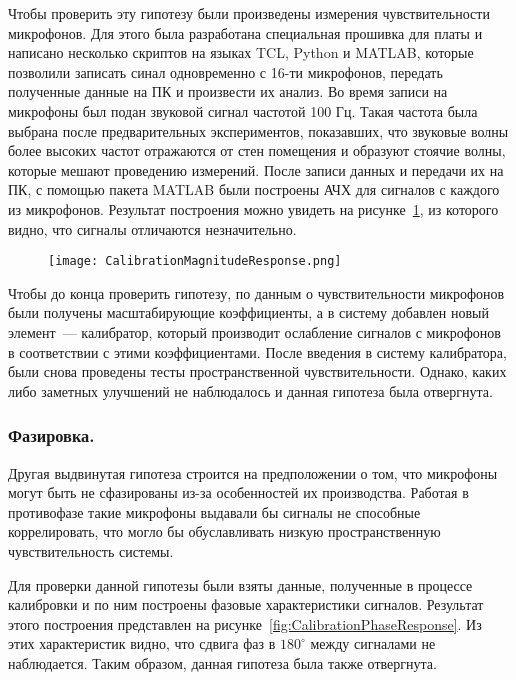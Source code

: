 Чтобы проверить эту гипотезу были произведены измерения чувствительности микрофонов. Для этого была разработана специальная прошивка для платы \boardname{} и написано несколько скриптов на языках TCL, Python и MATLAB, которые позволили записать синал одновременно с 16-ти микрофонов, передать полученные данные на ПК и произвести их анализ. Во время записи на микрофоны был подан звуковой сигнал частотой 100 Гц. Такая частота была выбрана после предварительных экспериментов, показавших, что звуковые волны более высоких частот отражаются от стен помещения и образуют стоячие волны, которые мешают проведению измерений. После записи данных и передачи их на ПК, с помощью пакета MATLAB были построены АЧХ для сигналов с каждого из микрофонов. Результат построения можно увидеть на рисунке~\ref{fig:CalibrationMagnitudeResponse}, из которого видно, что сигналы отличаются незначительно.

\begin{figure}[ht]
	\centering
	\texttt{[image: CalibrationMagnitudeResponse.png]}  
	\caption{}
	\label{fig:CalibrationMagnitudeResponse}
\end{figure}

Чтобы до конца проверить гипотезу, по данным о чувствительности микрофонов были получены масштабирующие коэффициенты, а в систему добавлен новый элемент~--- калибратор, который производит ослабление сигналов с микрофонов в соответствии с этими коэффициентами. После введения в систему калибратора, были снова проведены тесты пространственной чувствительности. Однако, каких либо заметных улучшений не наблюдалось и данная гипотеза была отвергнута.

\subsubsection{Фазировка. }
Другая выдвинутая гипотеза строится на предположении о том, что микрофоны могут быть не сфазированы из-за особенностей их производства. Работая в противофазе такие микрофоны выдавали бы сигналы не способные коррелировать, что могло бы обуславливать низкую пространственную чувствительность системы.

Для проверки данной гипотезы были взяты данные, полученные в процессе калибровки и по ним построены фазовые характеристики сигналов. Результат этого построения представлен на рисунке~\ref{fig:CalibrationPhaseResponse}. Из этих характеристик видно, что сдвига фаз в $180^{\circ}$ между сигналами не наблюдается. Таким образом, данная гипотеза была также отвергнута.

